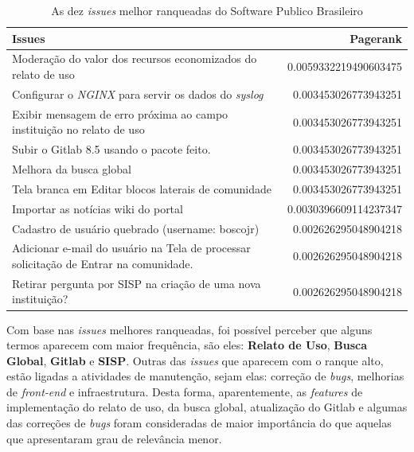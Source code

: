 \begin{table}[h]
    \begin{tabularx}{\textwidth}{|X|r|}
        \toprule
    	\textbf{Issues} & \textbf{Pagerank} \\
    	\hline	
            \midrule
            Moderação do valor dos recursos economizados do relato de uso & 0.0059332219490603475 \\ \hline
            Configurar o \textit{NGINX} para servir os dados do \textit{syslog} & 0.003453026773943251 \\ \hline
            Exibir mensagem de erro próxima ao campo instituição no relato de uso &  0.003453026773943251 \\\hline
            Subir o Gitlab 8.5 usando o pacote feito. & 0.003453026773943251 \\\hline
            Melhora da busca global & 0.003453026773943251 \\\hline
            Tela branca em Editar blocos laterais de comunidade & 0.003453026773943251 \\\hline
            Importar as notícias wiki do portal &  0.0030396609114237347 \\\hline
            Cadastro de usuário quebrado (username: boscojr) & 0.002626295048904218 \\\hline
            Adicionar e-mail do usuário na Tela de processar solicitação de Entrar na comunidade. & 0.002626295048904218 \\\hline
            Retirar pergunta por SISP na criação de uma nova instituição? & 0.002626295048904218 \\\hline
            \bottomrule
    \end{tabularx}
    \label{tab:pagerank}
    \caption{As dez \textit{issues} melhor ranqueadas do Software Publico Brasileiro}
\end{table}

Com base nas \textit{issues} melhores ranqueadas, foi possível perceber que alguns termos aparecem com maior frequência, são eles: \textbf{Relato de Uso}, \textbf{Busca Global}, \textbf{Gitlab} e \textbf{SISP}. Outras das \textit{issues} que aparecem com o ranque alto, estão ligadas a atividades de manutenção, sejam elas: correção de \textit{bugs}, melhorias de \textit{front-end} e infraestrutura. Desta forma, aparentemente, as \textit{features} de implementação do relato de uso, da busca global, atualização do Gitlab e algumas das correções de \textit{bugs} foram consideradas de maior importância do que aquelas que apresentaram grau de relevância menor.

